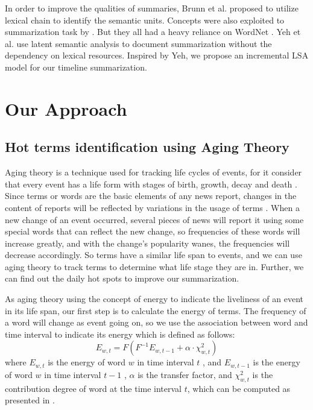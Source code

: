 \documentclass[runningheads,a4paper]{llncs}
\begin{document}
In order to improve the qualities of summaries, Brunn et al. \cite{2001-Brunn-p-} proposed to utilize lexical chain to identify the semantic units. Concepts were also exploited to summarization task by \cite{2007-Ye-p1643-1662}. But they all had a heavy reliance on WordNet \cite{1990-Miller-p235-244}. Yeh et al. \cite{2001-Gong-p19-25} use latent semantic analysis to document summarization without the dependency on lexical resources. Inspired by Yeh, we propose an incremental LSA model for our timeline summarization. 


\section{Our Approach}

\subsection{Hot terms identification using Aging Theory}

Aging theory is a technique used for tracking life cycles of events, for it consider that every event has a life form with stages of birth, growth, decay and death \cite{2003-Chen-p47-59}. Since terms or words are the basic elements of any news report, changes in the content of reports will be reflected by variations in the usage of terms \cite{2007-Chen-p1016-1025}. When a new change of an event occurred, several pieces of news will report it using some special words that can reflect the new change, so frequencies of these words will increase greatly, and with the change’s popularity wanes, the frequencies will decrease accordingly. So terms have a similar life span to events, and we can use aging theory to track terms to determine what life stage they are in. Further, we can find out the daily hot spots to improve our summarization.

As aging theory using the concept of energy to indicate the liveliness of an event in its life span, our first step is to calculate the energy of terms. The frequency of a word will change as event going on, so we use the association between word  and time interval  to indicate its energy which is defined as follows:
\begin{equation}
  E_{w,t} =F(F^{-1}E_{w,t-1}+\alpha\cdot\chi^2_{w,t})
\end{equation}
where $E_{w,t}$ is the energy of word $w$  in time interval $t$ , and $E_{w,t-1}$  is the energy of word $w$ in time interval $t-1$ , $\alpha$ is the transfer factor, and $\chi^2_{w,t}$  is the contribution degree of word  at the time interval $t$, which can be computed as presented in \cite{2000-Swan-p49-56}. 
\end{document}
